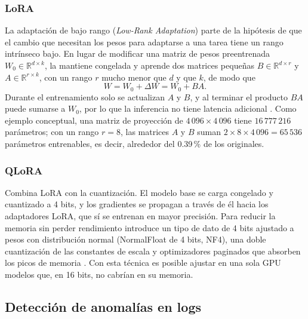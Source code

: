 \subsubsection{LoRA}\label{sec:mt_lora}

La adaptación de bajo rango (\textit{Low-Rank Adaptation}) parte de la hipótesis de que el cambio que necesitan los pesos para adaptarse a una tarea tiene un rango intrínseco bajo. En lugar de modificar una matriz de pesos preentrenada $W_0 \in \mathbb{R}^{d \times k}$, la mantiene congelada y aprende dos matrices pequeñas $B \in \mathbb{R}^{d \times r}$ y $A \in \mathbb{R}^{r \times k}$, con un rango $r$ mucho menor que $d$ y que $k$, de modo que
\begin{equation}
W = W_0 + \Delta W = W_0 + BA.
\end{equation}
Durante el entrenamiento solo se actualizan $A$ y $B$, y al terminar el producto $BA$ puede sumarse a $W_0$, por lo que la inferencia no tiene latencia adicional \cite{hu2022_lora}. Como ejemplo conceptual, una matriz de proyección de $4\,096 \times 4\,096$ tiene $16\,777\,216$ parámetros; con un rango $r = 8$, las matrices $A$ y $B$ suman $2 \times 8 \times 4\,096 = 65\,536$ parámetros entrenables, es decir, alrededor del 0.39\,\% de los originales.

\subsubsection{QLoRA}\label{sec:mt_qlora}

Combina LoRA con la cuantización. El modelo base se carga congelado y cuantizado a 4 bits, y los gradientes se propagan a través de él hacia los adaptadores LoRA, que sí se entrenan en mayor precisión. Para reducir la memoria sin perder rendimiento introduce un tipo de dato de 4 bits ajustado a pesos con distribución normal (NormalFloat de 4 bits, NF4), una doble cuantización de las constantes de escala y optimizadores paginados que absorben los picos de memoria \cite{dettmers2023_qlora}. Con esta técnica es posible ajustar en una sola GPU modelos que, en 16 bits, no cabrían en su memoria.

\subsection{Detección de anomalías en logs}\label{sec:mt_anomalias}

